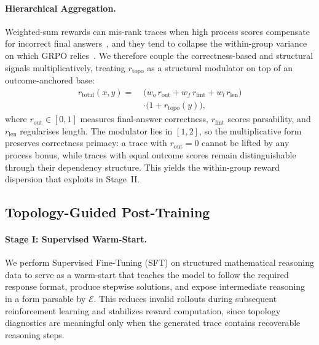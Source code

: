 \paragraph{Hierarchical Aggregation.}
Weighted-sum rewards can mis-rank traces when high process scores compensate for incorrect final answers~\citep{Denison2024SycophancyTS}, and they tend to collapse the within-group variance on which GRPO relies~\citep{yu2025dapo,kazemnejad2025vineppo}. We therefore couple the correctness-based and structural signals multiplicatively, treating $r_{\mathrm{topo}}$ as a structural modulator on top of an outcome-anchored base:
\begin{equation}
\label{eq:r_total}
\begin{aligned}
r_{\mathrm{total}}(x,y)=\;
&\bigl(w_o\,r_{\mathrm{out}}+w_f\,r_{\mathrm{fmt}}+w_l\,r_{\mathrm{len}}\bigr)\\
&\cdot\bigl(1+r_{\mathrm{topo}}(y)\bigr),
\end{aligned}
\end{equation}
where $r_{\mathrm{out}}\!\in\![0,1]$ measures final-answer correctness, $r_{\mathrm{fmt}}$ scores parsability, and $r_{\mathrm{len}}$ regularises length. The modulator lies in $[1,2]$, so the multiplicative form preserves correctness primacy: a trace with $r_{\mathrm{out}}\!=\!0$ cannot be lifted by any process bonus, while traces with equal outcome scores remain distinguishable through their dependency structure. This yields the within-group reward dispersion that \estimation exploits in Stage~II.

\subsection{Topology-Guided Post-Training}
\label{sec:post_training}

\paragraph{Stage I: Supervised Warm-Start.}
We perform Supervised Fine-Tuning (SFT) on structured mathematical reasoning data to serve as a warm-start that teaches the model to follow the required response format, produce stepwise solutions, and expose intermediate reasoning in a form parsable by $\mathcal{E}$. This reduces invalid rollouts during subsequent reinforcement learning and stabilizes reward computation, since topology diagnostics are meaningful only when the generated trace contains recoverable reasoning steps.

